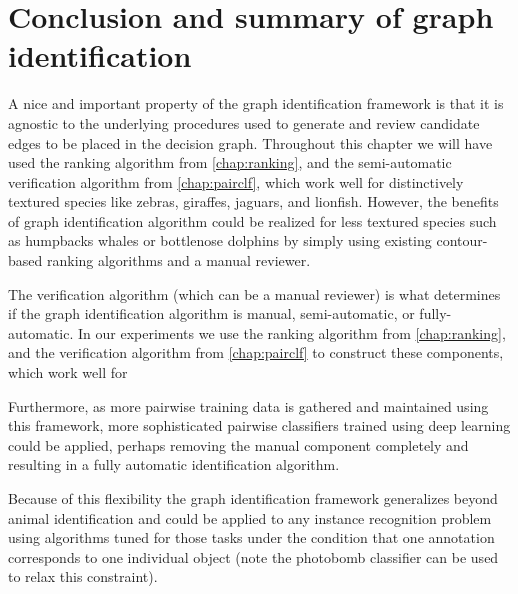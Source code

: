 
\section{Conclusion and summary of graph identification}\label{sec:graphconclusion}

A nice and important property of the graph identification framework is that it is agnostic to the underlying procedures
used to generate and review candidate edges to be placed in the decision graph. Throughout this chapter we will have
used the ranking algorithm from \cref{chap:ranking}, and the semi-automatic verification algorithm from
\cref{chap:pairclf}, which work well for distinctively textured species like zebras, giraffes, jaguars, and lionfish.
However, the benefits of graph identification algorithm could be realized for less textured species such as humpbacks
whales or bottlenose dolphins by simply using existing contour-based ranking algorithms and a manual reviewer.

The verification algorithm (which can be a manual reviewer) is what determines
  if the graph identification algorithm is manual, semi-automatic, or
  fully-automatic.
In our experiments we use the ranking algorithm from \cref{chap:ranking}, and
  the verification algorithm from \cref{chap:pairclf} to construct these
  components, which work well for
  
Furthermore, as more pairwise training data is gathered and maintained using
  this framework, more sophisticated pairwise classifiers trained using deep
  learning could be applied, perhaps removing the manual component completely
  and resulting in a fully automatic identification algorithm.

Because of this flexibility the graph identification framework generalizes
  beyond animal identification and could be applied to any instance recognition
  problem using algorithms tuned for those tasks under the condition that one
  annotation corresponds to one individual object (note the photobomb classifier
  can be used to relax this constraint).


